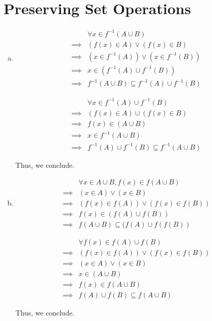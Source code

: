 \documentclass{article}
\begin{document}
    \part*{Preserving Set Operations}
    \begin{enumerate}[(a).]
        \item \begin{align*}
            &\forall x \in f^{-1}(A \cup B)\\
            \implies& (f(x) \in A) \vee (f(x) \in B)\\
            \implies& (x \in f^{-1}(A)) \vee (x \in f^{-1}(B))\\
            \implies& x \in (f^{-1}(A) \cup f^{-1}(B))\\
            \implies& f^{-1}(A \cup B) \subseteq f^{-1}(A) \cup f^{-1}(B)
        \end{align*}

        \begin{align*}
            &\forall x \in f^{-1}(A) \cup f^{-1}(B)\\
            \implies& (f(x) \in A) \cup (f(x) \in B)\\
            \implies& f(x) \in (A \cup B)\\
            \implies& x \in f^{-1}(A \cup B)\\
            \implies& f^{-1}(A) \cup f^{-1}(B) \subseteq f^{-1}(A \cup B) 
        \end{align*}

        Thus, we conclude.

        \item \begin{align*}
            &\forall x \in A \cup B, f(x) \in f(A \cup B)\\
            \implies& (x \in A) \vee (x \in B)\\
            \implies& (f(x) \in f(A)) \vee (f(x) \in f(B))\\
            \implies& f(x) \in (f(A) \cup f(B))\\
            \implies& f(A \cup B) \subseteq (f(A) \cup f(f(B))
        \end{align*}

        \begin{align*}
            &\forall f(x) \in f(A) \cup f(B)\\
            \implies& (f(x) \in f(A)) \vee (f(x) \in f(B))\\
            \implies& (x \in A) \vee (x \in B)\\
            \implies& x \in (A \cup B)\\
            \implies& f(x) \in f(A \cup B)\\
            \implies& f(A) \cup f(B) \subseteq f(A \cup B)
        \end{align*}

        Thus, we conclude.
    \end{enumerate}
\end{document}
